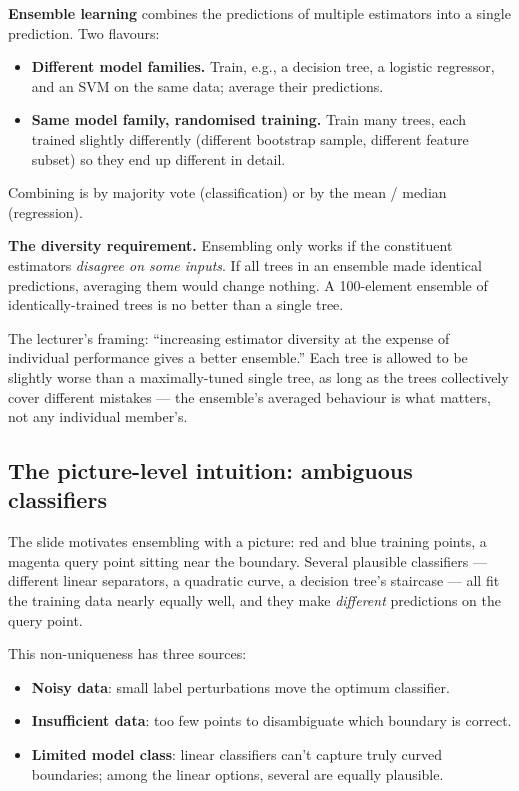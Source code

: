 \documentclass[11pt, a4paper]{article}
\begin{document}
\begin{defbox}
\textbf{Ensemble learning} combines the predictions of multiple estimators into a single prediction. Two flavours:
\begin{itemize}
  \item \textbf{Different model families.} Train, e.g., a decision tree, a logistic regressor, and an SVM on the same data; average their predictions.
  \item \textbf{Same model family, randomised training.} Train many trees, each trained slightly differently (different bootstrap sample, different feature subset) so they end up different in detail.
\end{itemize}
Combining is by majority vote (classification) or by the mean / median (regression).
\end{defbox}

\textbf{The diversity requirement.} Ensembling only works if the constituent estimators \emph{disagree on some inputs}. If all trees in an ensemble made identical predictions, averaging them would change nothing. A 100-element ensemble of identically-trained trees is no better than a single tree.

\begin{notebox}
The lecturer's framing: ``increasing estimator diversity at the expense of individual performance gives a better ensemble.'' Each tree is allowed to be slightly worse than a maximally-tuned single tree, as long as the trees collectively cover different mistakes — the ensemble's averaged behaviour is what matters, not any individual member's.
\end{notebox}

\subsection{The picture-level intuition: ambiguous classifiers}

The slide motivates ensembling with a picture: red and blue training points, a magenta query point sitting near the boundary. Several plausible classifiers — different linear separators, a quadratic curve, a decision tree's staircase — all fit the training data nearly equally well, and they make \emph{different} predictions on the query point.

This non-uniqueness has three sources:
\begin{itemize}
  \item \textbf{Noisy data}: small label perturbations move the optimum classifier.
  \item \textbf{Insufficient data}: too few points to disambiguate which boundary is correct.
  \item \textbf{Limited model class}: linear classifiers can't capture truly curved boundaries; among the linear options, several are equally plausible.
\end{itemize}
\end{document}
